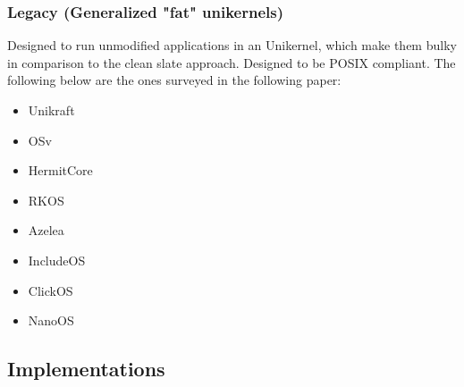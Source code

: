 \subsubsection{Legacy (Generalized "fat" unikernels)}
Designed to run unmodified applications in an Unikernel, 
which make them bulky in comparison to the clean slate approach. 
Designed to be POSIX compliant. The following below 
are the ones surveyed in the following paper: 
\begin{itemize}
  \item Unikraft
  \item OSv 
  \item HermitCore 
  \item RKOS
  \item Azelea
  \item IncludeOS 
  \item ClickOS
  \item NanoOS
\end{itemize}
%
%
\subsection{Implementations}

